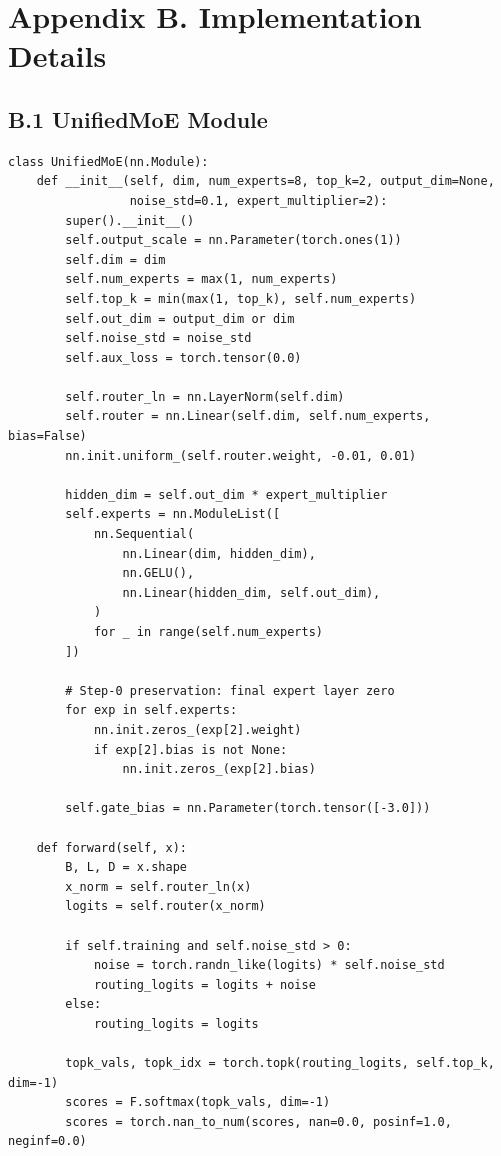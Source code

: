 \section{Appendix B. Implementation Details}

\subsection{B.1 UnifiedMoE Module}

\begin{lstlisting}
class UnifiedMoE(nn.Module):
    def __init__(self, dim, num_experts=8, top_k=2, output_dim=None,
                 noise_std=0.1, expert_multiplier=2):
        super().__init__()
        self.output_scale = nn.Parameter(torch.ones(1))
        self.dim = dim
        self.num_experts = max(1, num_experts)
        self.top_k = min(max(1, top_k), self.num_experts)
        self.out_dim = output_dim or dim
        self.noise_std = noise_std
        self.aux_loss = torch.tensor(0.0)
        
        self.router_ln = nn.LayerNorm(self.dim)
        self.router = nn.Linear(self.dim, self.num_experts, bias=False)
        nn.init.uniform_(self.router.weight, -0.01, 0.01)
        
        hidden_dim = self.out_dim * expert_multiplier
        self.experts = nn.ModuleList([
            nn.Sequential(
                nn.Linear(dim, hidden_dim),
                nn.GELU(),
                nn.Linear(hidden_dim, self.out_dim),
            )
            for _ in range(self.num_experts)
        ])
        
        # Step-0 preservation: final expert layer zero
        for exp in self.experts:
            nn.init.zeros_(exp[2].weight)
            if exp[2].bias is not None:
                nn.init.zeros_(exp[2].bias)
        
        self.gate_bias = nn.Parameter(torch.tensor([-3.0]))
    
    def forward(self, x):
        B, L, D = x.shape
        x_norm = self.router_ln(x)
        logits = self.router(x_norm)
        
        if self.training and self.noise_std > 0:
            noise = torch.randn_like(logits) * self.noise_std
            routing_logits = logits + noise
        else:
            routing_logits = logits
        
        topk_vals, topk_idx = torch.topk(routing_logits, self.top_k, dim=-1)
        scores = F.softmax(topk_vals, dim=-1)
        scores = torch.nan_to_num(scores, nan=0.0, posinf=1.0, neginf=0.0)
        

\end{lstlisting}
